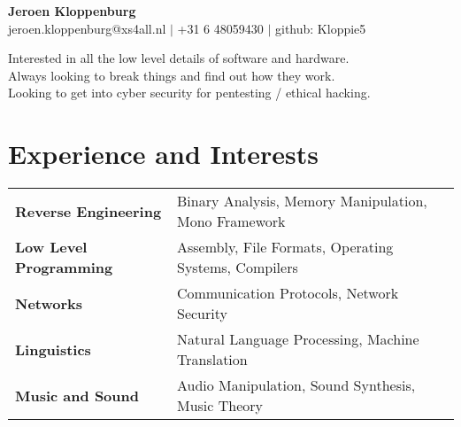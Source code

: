 \documentclass[12pt, a4paper]{article}
\begin{document}
  
  \begin{center}
    \small \textbf{\Huge Jeroen Kloppenburg} \\
    jeroen.kloppenburg@xs4all.nl $\vert$
    +31 6 48059430 $\vert$
    github: Kloppie5 \\
  \end{center}

  \noindent Interested in all the low level details of software and hardware.\\
	Always looking to break things and find out how they work.\\
	Looking to get into cyber security for pentesting / ethical hacking.
  
  \vspace{-10pt}\section*{Experience and Interests}
  \begin{tabularx}{\textwidth}{ l X }
    \textbf{Reverse Engineering} & Binary Analysis, Memory Manipulation, Mono Framework \\
    \textbf{Low Level Programming} & Assembly, File Formats, Operating Systems, Compilers \\
    \textbf{Networks} & Communication Protocols, Network Security \\
    \textbf{Linguistics} & Natural Language Processing, Machine Translation \\
		\textbf{Music and Sound} & Audio Manipulation, Sound Synthesis, Music Theory \\
  \end{tabularx}
\end{document}
